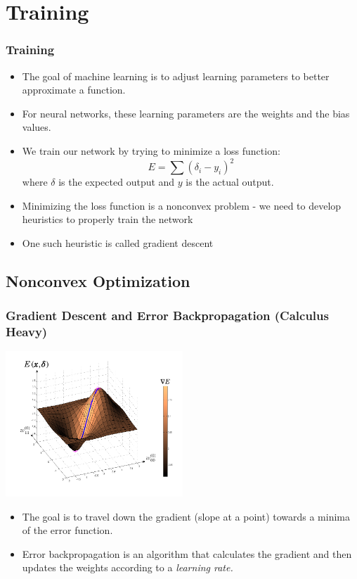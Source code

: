 \documentclass{beamer}
\begin{document}
\section{Training}
\begin{frame}
    \frametitle{Training}
    \begin{itemize}
        \item The goal of machine learning is to adjust learning parameters to better approximate a function.
        \item For neural networks, these learning parameters are the weights and the bias values.
        \item We train our network by trying to minimize a loss function:  $$E = \sum (\delta_{i}-y_{i})^2$$ where $\delta$ is the expected output and $y$ is the actual output.
        \item Minimizing the loss function is a nonconvex problem - we need to develop heuristics to properly train the network
        \item One such heuristic is called gradient descent
    \end{itemize}
\end{frame}


\subsection{Nonconvex Optimization}


\begin{frame}
    \frametitle{Gradient Descent and Error Backpropagation (Calculus Heavy)}
    \begin{center}
        \includegraphics[width=0.5\textwidth]{gradient_descent}
    \end{center}
    \begin{itemize}
        \item The goal is to travel down the gradient (slope at a point)
         towards a minima of the error function.
        \item Error backpropagation is an algorithm that calculates the gradient
        and then updates the weights according to a \emph{learning rate.}
    \end{itemize}
\end{frame}
\end{document}
